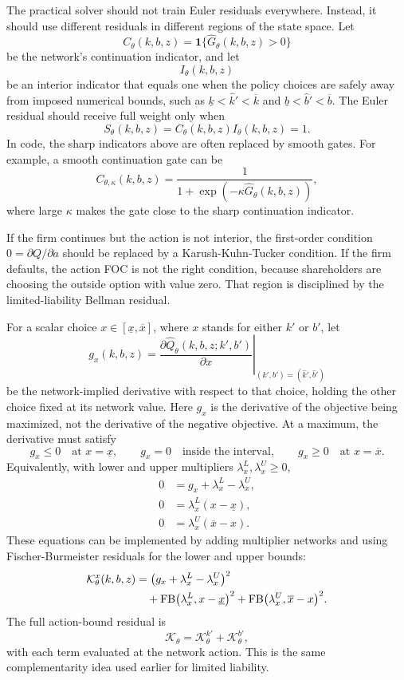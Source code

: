 \documentclass[11pt]{article}
\newcommand{\1}{\mathbf{1}}
\begin{document}
The practical solver should not train Euler residuals everywhere. Instead, it
should use different residuals in different regions of the state space. Let
\[
  C_\theta(k,b,z)=\1\{\widehat G_\theta(k,b,z)>0\}
\]
be the network's continuation indicator, and let
\[
  I_\theta(k,b,z)
\]
be an interior indicator that equals one when the policy choices are safely away
from imposed numerical bounds, such as \(\underline k<\widehat k'<\overline k\)
and \(\underline b<\widehat b'<\overline b\). The Euler residual should receive
full weight only when
\[
  S_\theta(k,b,z)=C_\theta(k,b,z)I_\theta(k,b,z)=1.
\]
In code, the sharp indicators above are often replaced by smooth gates. For
example, a smooth continuation gate can be
\[
  C_{\theta,\kappa}(k,b,z)
  =
  \frac{1}{1+\exp(-\kappa \widehat G_\theta(k,b,z))},
\]
where large \(\kappa\) makes the gate close to the sharp continuation
indicator.

If the firm continues but the action is not interior, the first-order condition
\(0=\partial Q/\partial a\) should be replaced by a
Karush-Kuhn-Tucker condition. If the firm defaults, the action FOC is not the
right condition, because shareholders are choosing the outside option with value
zero. That region is disciplined by the limited-liability Bellman residual.

For a scalar choice \(x\in[\underline x,\overline x]\), where \(x\) stands for
either \(k'\) or \(b'\), let
\[
  g_x(k,b,z)
  =
  \left.
  \frac{\partial \widehat Q_\theta(k,b,z;k',b')}
  {\partial x}
  \right|_{(k',b')=(\widehat k',\widehat b')}
\]
be the network-implied derivative with respect to that choice, holding the other
choice fixed at its network value. Here \(g_x\) is the derivative of the
objective being maximized, not the derivative of the negative objective. At a
maximum, the derivative must satisfy
\[
  g_x\le 0 \quad\text{at }x=\underline x,\qquad
  g_x=0 \quad\text{inside the interval},\qquad
  g_x\ge 0 \quad\text{at }x=\overline x.
\]
Equivalently, with lower and upper multipliers \(\lambda_x^L,\lambda_x^U\ge0\),
\begin{align}
  0&=g_x+\lambda_x^L-\lambda_x^U, \label{eq:kkt-stationarity}\\
  0&=\lambda_x^L(x-\underline x), \label{eq:kkt-lower}\\
  0&=\lambda_x^U(\overline x-x). \label{eq:kkt-upper}
\end{align}
These equations can be implemented by adding multiplier networks and using
Fischer-Burmeister residuals for the lower and upper bounds:
\begin{align}
  \mathcal K^x_\theta(k,b,z)
  &=
  \bigl(g_x+\lambda_x^L-\lambda_x^U\bigr)^2 \notag\\
  &\quad
  +\operatorname{FB}\bigl(\lambda_x^L,x-\underline x\bigr)^2
  +\operatorname{FB}\bigl(\lambda_x^U,\overline x-x\bigr)^2.
  \label{eq:kkt-residual-x}
\end{align}
The full action-bound residual is
\[
  \mathcal K_\theta=\mathcal K^{k'}_\theta+\mathcal K^{b'}_\theta,
\]
with each term evaluated at the network action. This is the same
complementarity idea used earlier for limited liability.
\end{document}
